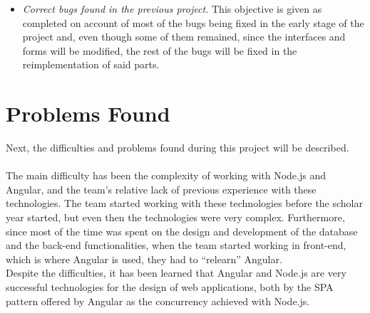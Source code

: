 \documentclass[11pt]{book}
\begin{document}
\begin{itemize}
		\item \emph{Correct bugs found in the previous project.}
		This objective is given as completed on account of most of the bugs being fixed in the early stage of the project and, even though some of them remained, since the interfaces and forms will be modified, the rest of the bugs will be fixed in the reimplementation of said parts.
	\end{itemize}
	
	\section{Problems Found}
	Next, the difficulties and problems found during this project will be described.\\\\
	The main difficulty has been the complexity of working with Node.js and Angular, and the team's relative lack of previous experience with these technologies. The team started working with these technologies before the scholar year started, but even then the technologies were very complex. Furthermore, since most of the time was spent on the design and development of the database and the back-end functionalities, when the team started working in front-end, which is where Angular is used, they had to ``relearn'' Angular.\\
	Despite the difficulties, it has been learned that Angular and Node.js are very successful technologies for the design of web applications, both by the SPA pattern offered by Angular as the concurrency achieved with Node.js.
	
\end{document}
